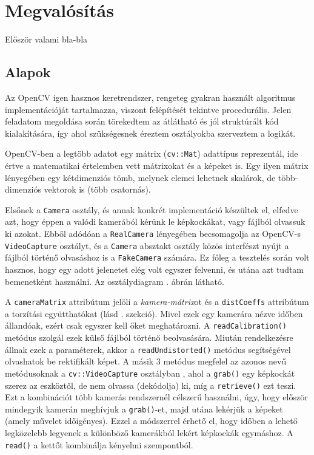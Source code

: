 \chapter{Megvalósítás}

{\color{red} Először valami bla-bla}



\section{Alapok}



Az OpenCV igen hasznos keretrendszer, rengeteg gyakran használt algoritmus implementációját tartalmazza, viszont felépítését tekintve procedurális. Jelen feladatom megoldása során törekedtem az átlátható és jól struktúrált kód kialakítására, így ahol szükségesnek éreztem osztályokba szerveztem a logikát.

OpenCV-ben a legtöbb adatot egy mátrix (\texttt{cv::Mat}) adattípus reprezentál, ide értve a matematikai értelemben vett mátrixokat és a képeket is. Egy ilyen mátrix lényegében egy kétdimenziós tömb, melynek elemei lehetnek skalárok, de több-dimenziós vektorok is (több csatornás).

Elsőnek a \texttt{Camera} osztály, és annak konkrét implementáció készültek el, elfedve azt, hogy éppen a valódi kamerából kérünk le képkockákat, vagy fájlból olvassuk ki azokat. Ebből adódóan a \texttt{RealCamera} lényegében becsomagolja az OpenCV-s \texttt{VideoCapture} osztályt, és a \texttt{Camera} absztakt osztály közös interfészt nyújt a fájlból történő olvasáshoz is a \texttt{FakeCamera} számára. Ez főleg a tesztelés során volt hasznos, hogy egy adott jelenetet elég volt egyszer felvenni, és utána azt tudtam bemenetként használni. Az osztálydiagram . ábrán látható.

A \texttt{cameraMatrix} attribútum jelöli a \textit{kamera-mátrix}ot és a \texttt{distCoeffs} attribútum a torzítási együtthatókat (lásd . szekció). Mivel ezek egy kamerára nézve időben állandóak, ezért csak egyszer kell őket meghatározni. A \texttt{readCalibration()} metódus szolgál ezek külső fájlból történő beolvasására. Miután rendelkezésre állnak ezek a paraméterek, akkor a \texttt{readUndistorted()} metódus segítségével olvashatok be rektifikált képet. A másik 3 metódus megfelel az azonos nevű metódusoknak a \texttt{cv::VideoCapture} osztályban \cite{cv_video}, ahol a \texttt{grab()} egy képkockát szerez az eszköztől, de nem olvassa (dekódolja) ki, míg a \texttt{retrieve()} ezt teszi. Ezt a kombinációt több kamerás rendszernél célszerű használni, úgy, hogy először mindegyik kamerán meghívjuk a \texttt{grab()}-et, majd utána lekérjük a képeket (amely művelet időigényes). Ezzel a módszerrel érhető el, hogy időben a lehető legközelebb legyenek a különböző kamerákból lekért képkockák egymáshoz. A \texttt{read()} a kettőt kombinálja kényelmi szempontból.


